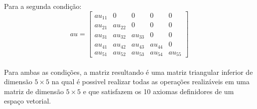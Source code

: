 Para a segunda condição:
\\
\[
    au =
    \begin{bmatrix}
        au_{11} & 0       & 0       & 0       & 0       \\
        au_{21} & au_{22} & 0       & 0       & 0       \\
        au_{31} & au_{32} & au_{33} & 0       & 0       \\
        au_{41} & au_{42} & au_{43} & au_{44} & 0       \\
        au_{51} & au_{52} & au_{53} & au_{54} & au_{55}
    \end{bmatrix}
\]
\\

Para ambas as condições, a matriz resultando é uma matriz triangular inferior de dimensão $5\times 5$ na qual é possivel realizar todas as operações realizáveis em uma matriz de dimensão $5\times 5$ e que satisfazem os 10 axiomas definidores de um espaço vetorial.